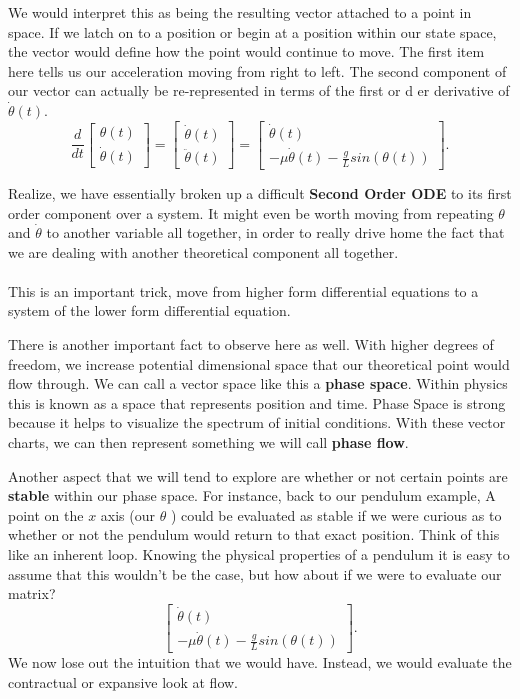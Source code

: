 \documentclass[10pt, oneside]{report}
\begin{document}
We would interpret this as being the resulting vector attached to a point in space.  If we latch on to a position or begin at a position within our state space, the vector would define how the point would continue to move. 
The first item here tells us our acceleration moving from right to left. The second component of our vector can actually be re-represented in terms of the first or d er derivative of $\dot{\theta}(t)$.
\[
\frac{d}{dt} \begin{bmatrix}
    \theta(t) \\
    \dot{\theta}(t)
\end{bmatrix} = 
\begin{bmatrix}
    \dot{\theta}(t)\\
    \ddot{\theta}(t)
    
\end{bmatrix} = 
\begin{bmatrix}
    \dot{\theta}(t)\\
    -\mu\dot{\theta}(t) - \frac{g}{L} sin (\theta(t))
\end{bmatrix}
.\] 

Realize, we have essentially broken up a difficult \textbf{Second Order ODE} to its first order component over a system.  It might even be worth moving from repeating $\theta$ and $\dot{\theta}$ to another variable all together, in order to really drive home the fact that we are dealing with another theoretical component all together.
\\
\\
This is an important trick, move from higher form differential equations to a system of the lower form differential equation. 

There is another important fact to observe here as well.  With higher degrees of freedom, we increase potential dimensional space that our theoretical point would flow through.  We can call a vector space like this a \textbf{phase space}.  Within physics this is known as a space that represents position and time.  Phase Space is strong because it helps to visualize the spectrum of initial conditions.  With these vector charts, we can then represent something we will call \textbf{phase flow}.  

Another aspect that we will tend to explore are whether or not certain points are \textbf{stable} within our phase space.  For instance, back to our pendulum example, A point on the $x$ axis (our $\theta$ ) could be evaluated as stable if we were curious as to whether or not the pendulum would return to that exact position.  Think of this like an inherent loop.  
Knowing the physical properties of a pendulum it is easy to assume that this wouldn't be the case, but how about if we were to evaluate our matrix? 
\[
\begin{bmatrix}
    \dot{\theta}(t)\\
    -\mu\dot{\theta}(t) - \frac{g}{L} sin (\theta(t))
\end{bmatrix}
.\] 
We now lose out the intuition that we would have.  Instead, we would evaluate the contractual or expansive look at flow.  
\end{document}
